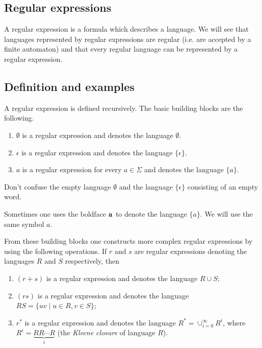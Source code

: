 \begin{page}

\section{Regular expressions}
A regular expression is a formula which describes a language.
We will see that languages represented by regular expressions are regular (i.e. are accepted by a finite automaton)
and that every regular language can be represented by a regular expression.

\subsection{Definition and examples}
A regular expression is defined recursively.
The basic building blocks are the following.
\begin{enumerate}
\item
$\emptyset$ is a regular expression and denotes the language $\emptyset$.
\item
$\epsilon$ is a regular expression and denotes the language $\{\epsilon\}$.
\item
$a$ is a regular expression for every $a \in \Sigma$ and denotes the language $\{a\}$.
\end{enumerate}
Don't confuse the empty language $\emptyset$ and the language $\{\epsilon\}$ consisting of an empty word.



Sometimes one uses the boldface $\bf{a}$ to denote the language $\{a\}$.
We will use the same symbol $a$.

From these building blocks one constructs more complex regular expressions by using the following operations.
If $r$ and $s$ are regular expressions denoting the languages $R$ and $S$ respectively, then
\begin{enumerate}
\item
$(r+s)$ is a regular expression and denotes the language $R \cup S$;
\item
$(rs)$ is a regular expression and denotes the language $RS = \{uv \mid u \in R, v \in S\}$;
\item
$r^*$ is a regular expression and denotes the language $R^* = \cup_{i=0}^\infty R^i$, where $R^i = \underbrace{RR \cdots R}_{i}$
(the \emph{Kleene closure} of language $R$).
\end{enumerate}


\end{page}

